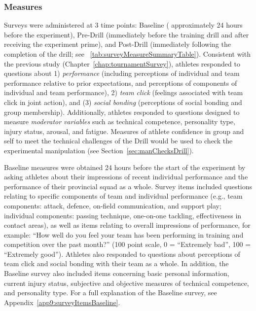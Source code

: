 \begin{CJK}{UTF8}{gbsn}
\subsubsection{Measures}


Surveys were administered at 3 time points: Baseline ( approximately 24 hours before the experiment), Pre-Drill (immediately before the training drill and after receiving the experiment prime), and Post-Drill (immediately following the completion of the drill; see ~\ref{tab:surveyMeasureSummaryTable}). Consistent with the previous study (Chapter~\ref{chap:tournamentSurvey}), athletes responded to questions about 1) \textit{performance} (including perceptions of individual and team performance relative to prior expectations, and perceptions of components of individual and team performance), 2) \textit{team click} (feelings associated with team click in joint action), and (3) \textit{social bonding} (perceptions of social bonding and group membership).  Additionally, athletes responded to questions designed to measure \textit{moderator variables} such as technical competence, personality type, injury status, arousal, and fatigue. Measures of athlete confidence in group and self to meet the technical challenges of the Drill would be used to check the experimental manipulation (see Section~\ref{sec:manChecksDrill}).


    


Baseline measures were obtained 24 hours before the start of the experiment by asking athletes about their impressions of recent individual performance and the performance of their provincial squad as a whole.  Survey items included questions relating to specific components of team and individual performance (e.g., team components: attack, defence, on-field communication, and support play; individual components: passing technique, one-on-one tackling, effectiveness in contact areas), as well as items relating to overall impressions of performance, for example: ``How well do you feel your team has been performing in training and competition over the past month?'' (100 point scale, 0 = ``Extremely bad'', 100 = ``Extremely good'').  Athletes also responded to questions about perceptions of team click and social bonding with their team as a whole.  In addition, the Baseline survey also included items concerning basic personal information, current injury status, subjective and objective measures of technical competence, and personality type.  For a full explanation of the Baseline survey, see Appendix~\ref{app9:surveyItemsBaseline}.



\end{CJK}
